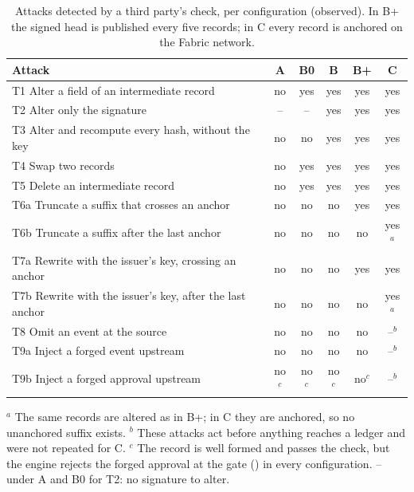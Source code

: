 \begin{table}[t]
\caption{Attacks detected by a third party's check, per configuration (observed). In B+ the signed head is published every five records; in C every record is anchored on the Fabric network.}
\label{tab:tamper}
\footnotesize
\begin{tabularx}{\textwidth}{@{}Lccccc@{}}
\toprule
Attack & A & B0 & B & B+ & C \\
\midrule
T1 Alter a field of an intermediate record & no & yes & yes & yes & yes \\
T2 Alter only the signature & -- & -- & yes & yes & yes \\
T3 Alter and recompute every hash, without the key & no & no & yes & yes & yes \\
T4 Swap two records & no & yes & yes & yes & yes \\
T5 Delete an intermediate record & no & yes & yes & yes & yes \\
T6a Truncate a suffix that crosses an anchor & no & no & no & yes & yes \\
T6b Truncate a suffix after the last anchor & no & no & no & no & yes$^{a}$ \\
T7a Rewrite with the issuer's key, crossing an anchor & no & no & no & yes & yes \\
T7b Rewrite with the issuer's key, after the last anchor & no & no & no & no & yes$^{a}$ \\
T8 Omit an event at the source & no & no & no & no & --$^{b}$ \\
T9a Inject a forged event upstream & no & no & no & no & --$^{b}$ \\
T9b Inject a forged approval upstream & no$^{c}$ & no$^{c}$ & no$^{c}$ & no$^{c}$ & --$^{b}$ \\
\bottomrule
\end{tabularx}

\smallskip
\raggedright\footnotesize
$^{a}$ The same records are altered as in B+; in C they are anchored, so no unanchored suffix exists.
$^{b}$ These attacks act before anything reaches a ledger and were not repeated for C.
$^{c}$ The record is well formed and passes the check, but the engine rejects the forged approval at the gate () in every configuration.
-- under A and B0 for T2: no signature to alter.
\end{table}
